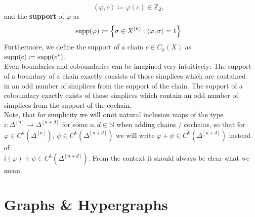 \[
\left\langle\varphi,c\right\rangle\coloneqq \varphi(c)\in\mathbb{Z}_2,
\]
and the \textbf{support} of \(\varphi\) as
\[
\mathrm{supp}(\varphi)\coloneqq \left\{\sigma\in X^{(k)}:\left\langle\varphi,\sigma\right\rangle=1\right\}
\]
Furthermore, we define the support of a chain \(c\in C_k(X)\) as \(\mathrm{supp}(c)\coloneqq \mathrm{supp}(c^*)\).\\
Even boundaries and coboundaries can be imagined very intuitively: The support of a boundary of a chain exactly consists of those simplices which are contained in an odd number of simplices from the support of the chain. The support of a coboundary exactly exists of those simplices which contain an odd number of simplices from the support of the cochain.\\
Note, that for simplicity we will omit natural inclusion maps of the type\\
\(i:\Delta^{[n]}\longrightarrow\Delta^{[n+d]}\) for some \(n,d\in\mathbb{N}\) when adding chains / cochains, so that for \(\varphi\in C^k(\Delta^{[n]})\text{, }\psi\in C^k(\Delta^{[n+d]})\) we will write \(\varphi+\psi\in C^k(\Delta^{[n+d]})\) instead of\\
\(i(\varphi)+\psi\in C^k(\Delta^{[n+d]})\). From the context it should always be clear what we mean.


\section*{Graphs \& Hypergraphs}

